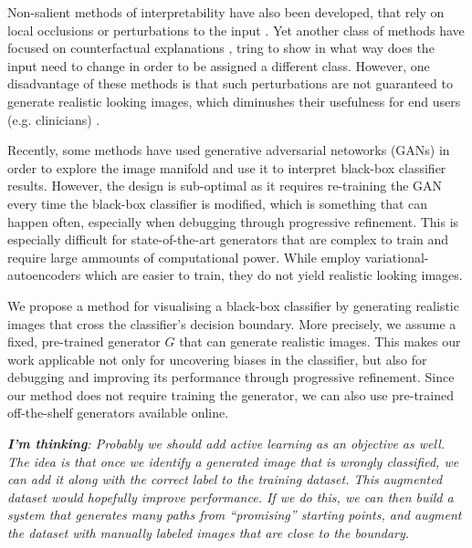 \documentclass{article}
\begin{document}
Non-salient methods of interpretability have also been developed, that rely on local occlusions or perturbations to the input \cite{zhou2014object,fong2017interpretable}. Yet another class of methods have focused on counterfactual explanations \cite{wachter2017counterfactual,goyal2019counterfactual}, tring to show in what way does the input need to change in order to be assigned a different class. However, one disadvantage of these methods is that such perturbations are not guaranteed to generate realistic looking images, which diminushes their usefulness for end users (e.g. clinicians) \cite{singla2019explanation}.

Recently, some methods \cite{singla2019explanation,samangouei2018explaingan,liu2019generative} have used generative adversarial netoworks (GANs) in order to explore the image manifold and use it to interpret black-box classifier results. However, the design is sub-optimal as it requires re-training the GAN every time the black-box classifier is modified, which is something that can happen often, especially when debugging through progressive refinement. This is especially difficult for state-of-the-art \cite{karras2019style,brock2018large} generators that are complex to train and require large ammounts of computational power. While \cite{joshi2018xgems} employ variational-autoencoders which are easier to train, they do not yield realistic looking images.

We propose a method for visualising a black-box classifier by generating realistic images that cross the classifier's decision boundary. More precisely, we assume a fixed, pre-trained generator $G$ that can generate realistic images. This makes our work applicable not only for uncovering biases in the classifier, but also for debugging and improving its performance through progressive refinement. Since our method does not require training the generator, we can also use pre-trained off-the-shelf generators available online. 

\emph{\textbf{I'm thinking}: Probably we should add active learning as an objective as well. The idea is that once we identify a generated image that is wrongly classified, we can add it along with the correct label to the training dataset. This augmented dataset would hopefully improve performance. If we do this, we can then build a system that generates many paths from ``promising'' starting points, and augment the dataset with manually labeled images that are close to the boundary.}


\newcommand{\bz}{\textbf{z}}
\end{document}
